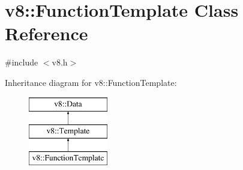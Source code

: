 \hypertarget{classv8_1_1FunctionTemplate}{}\section{v8\+:\+:Function\+Template Class Reference}
\label{classv8_1_1FunctionTemplate}


{\ttfamily \#include $<$v8.\+h$>$}

Inheritance diagram for v8\+:\+:Function\+Template\+:\begin{figure}[H]
\begin{center}
\leavevmode
\includegraphics[height=3.000000cm]{classv8_1_1FunctionTemplate}
\end{center}
\end{figure}
